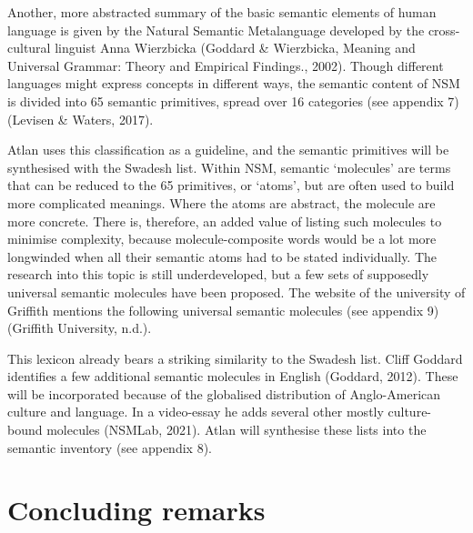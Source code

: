 Another, more abstracted summary of the basic semantic elements of human language is given by the Natural Semantic Metalanguage developed by the cross-cultural linguist Anna Wierzbicka (Goddard \& Wierzbicka, Meaning and Universal Grammar: Theory and Empirical Findings., 2002). Though different languages might express concepts in different ways, the semantic content of NSM is divided into 65 semantic primitives, spread over 16 categories (see appendix 7) (Levisen \& Waters, 2017). 

Atlan uses this classification as a guideline, and the semantic primitives will be synthesised with the Swadesh list. Within NSM, semantic ‘molecules’ are terms that can be reduced to the 65 primitives, or ‘atoms’, but are often used to build more complicated meanings. Where the atoms are abstract, the molecule are more concrete. There is, therefore, an added value of listing such molecules to minimise complexity, because molecule-composite words would be a lot more longwinded when all their semantic atoms had to be stated individually. The research into this topic is still underdeveloped, but a few sets of supposedly universal semantic molecules have been proposed. The website of the university of Griffith mentions the following universal semantic molecules (see appendix 9) (Griffith University, n.d.).  

This lexicon already bears a striking similarity to the Swadesh list. Cliff Goddard identifies a few additional semantic molecules in English (Goddard, 2012). These will be incorporated because of the globalised distribution of Anglo-American culture and language. In a video-essay he adds several other mostly culture-bound molecules (NSMLab, 2021). Atlan will synthesise these lists into the semantic inventory (see appendix 8).  

 

\section{Concluding remarks}

